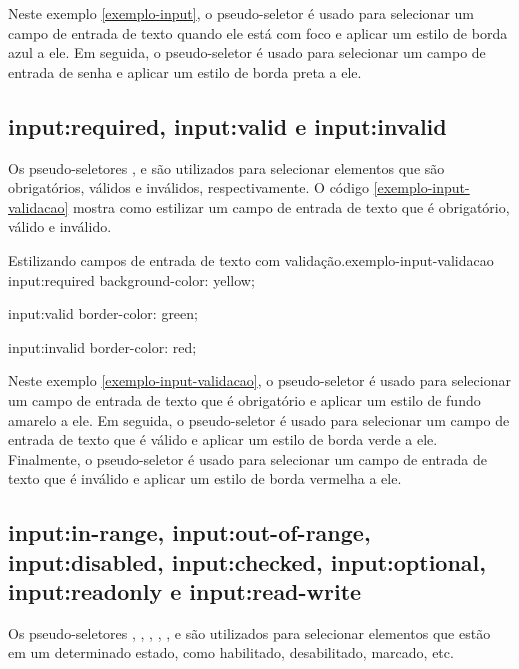Neste exemplo \ref{exemplo-input}, o pseudo-seletor  é usado para selecionar um campo de entrada de texto quando ele está com foco e aplicar um estilo de borda azul a ele. Em seguida, o pseudo-seletor  é usado para selecionar um campo de entrada de senha e aplicar um estilo de borda preta a ele.

\subsection{input:required, input:valid e input:invalid}

Os pseudo-seletores ,  e  são utilizados para selecionar elementos  que são obrigatórios, válidos e inválidos, respectivamente. O código \ref{exemplo-input-validacao} mostra como estilizar um campo de entrada de texto que é obrigatório, válido e inválido.

\begin{csscode}{Estilizando campos de entrada de texto com validação.}{exemplo-input-validacao}
input:required {
    background-color: yellow;
}

input:valid {
    border-color: green;
}

input:invalid {
    border-color: red;
}
\end{csscode}

Neste exemplo \ref{exemplo-input-validacao}, o pseudo-seletor  é usado para selecionar um campo de entrada de texto que é obrigatório e aplicar um estilo de fundo amarelo a ele. Em seguida, o pseudo-seletor  é usado para selecionar um campo de entrada de texto que é válido e aplicar um estilo de borda verde a ele. Finalmente, o pseudo-seletor  é usado para selecionar um campo de entrada de texto que é inválido e aplicar um estilo de borda vermelha a ele.

\subsection{input:in-range, input:out-of-range, input:disabled, input:checked, input:optional, input:readonly e input:read-write}

Os pseudo-seletores , , , , ,  e  são utilizados para selecionar elementos  que estão em um determinado estado, como habilitado, desabilitado, marcado, etc.

